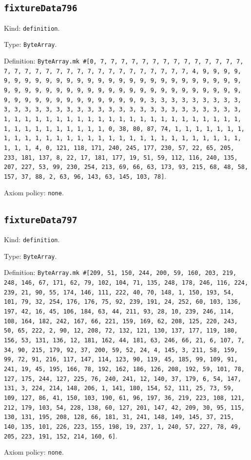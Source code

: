 \documentclass[11pt]{article}
\begin{document}
\subsection*{\texttt{fixtureData796}}
\noindent Kind: \texttt{definition}.\par
\noindent Type: \texttt{ByteArray}.\par
\noindent Definition: \texttt{ByteArray.mk \#[0, 7, 7, 7, 7, 7, 7, 7, 7, 7, 7, 7, 7, 7, 7, 7, 7, 7, 7, 7, 7, 7, 7, 7, 7, 7, 7, 7, 7, 7, 7, 7, 7, 4, 9, 9, 9, 9, 9, 9, 9, 9, 9, 9, 9, 9, 9, 9, 9, 9, 9, 9, 9, 9, 9, 9, 9, 9, 9, 9, 9, 9, 9, 9, 9, 9, 9, 9, 9, 9, 9, 9, 9, 9, 9, 9, 9, 9, 9, 9, 9, 9, 9, 9, 9, 9, 9, 9, 9, 9, 9, 9, 9, 9, 9, 9, 9, 9, 3, 3, 3, 3, 3, 3, 3, 3, 3, 3, 3, 3, 3, 3, 3, 3, 3, 3, 3, 3, 3, 3, 3, 3, 3, 3, 3, 3, 3, 3, 3, 3, 1, 1, 1, 1, 1, 1, 1, 1, 1, 1, 1, 1, 1, 1, 1, 1, 1, 1, 1, 1, 1, 1, 1, 1, 1, 1, 1, 1, 1, 1, 1, 1, 1, 0, 38, 80, 87, 74, 1, 1, 1, 1, 1, 1, 1, 1, 1, 1, 1, 1, 1, 1, 1, 1, 1, 1, 1, 1, 1, 1, 1, 1, 1, 1, 1, 1, 1, 1, 1, 1, 1, 4, 0, 121, 118, 171, 240, 245, 177, 230, 57, 22, 65, 205, 233, 181, 137, 8, 22, 17, 181, 177, 19, 51, 59, 112, 116, 240, 135, 207, 227, 53, 99, 230, 254, 213, 69, 66, 63, 173, 93, 215, 68, 48, 58, 157, 37, 88, 2, 63, 96, 143, 63, 145, 103, 78]}.\par
\noindent Axiom policy: \texttt{none}.\par
\subsection*{\texttt{fixtureData797}}
\noindent Kind: \texttt{definition}.\par
\noindent Type: \texttt{ByteArray}.\par
\noindent Definition: \texttt{ByteArray.mk \#[209, 51, 150, 244, 200, 59, 160, 203, 219, 248, 146, 67, 171, 62, 79, 102, 104, 71, 135, 248, 178, 246, 116, 224, 239, 21, 90, 55, 174, 146, 111, 222, 40, 70, 148, 1, 150, 193, 54, 101, 79, 32, 254, 176, 176, 75, 92, 239, 191, 24, 252, 60, 103, 136, 197, 42, 16, 45, 106, 184, 63, 44, 211, 93, 28, 10, 239, 246, 114, 108, 164, 182, 242, 167, 66, 221, 159, 169, 62, 208, 125, 220, 243, 50, 65, 222, 2, 90, 12, 208, 72, 132, 121, 130, 137, 177, 119, 180, 156, 53, 131, 136, 12, 181, 162, 44, 181, 63, 246, 66, 21, 6, 107, 7, 34, 90, 215, 179, 92, 37, 200, 59, 52, 24, 4, 145, 3, 211, 58, 159, 99, 72, 91, 216, 117, 147, 114, 123, 90, 119, 45, 185, 99, 109, 91, 241, 19, 45, 195, 166, 78, 192, 162, 186, 126, 208, 192, 59, 101, 78, 127, 175, 244, 127, 225, 76, 240, 241, 12, 140, 37, 179, 6, 54, 147, 131, 3, 224, 214, 148, 206, 1, 141, 180, 154, 52, 111, 25, 73, 59, 109, 127, 86, 41, 150, 103, 190, 61, 96, 197, 36, 219, 223, 108, 121, 212, 179, 103, 54, 228, 138, 60, 127, 201, 147, 42, 209, 30, 95, 115, 130, 131, 195, 208, 128, 66, 181, 31, 241, 148, 149, 145, 37, 215, 140, 135, 101, 226, 223, 155, 198, 19, 237, 1, 240, 57, 227, 78, 49, 205, 223, 191, 152, 214, 160, 6]}.\par
\noindent Axiom policy: \texttt{none}.\par
\end{document}

